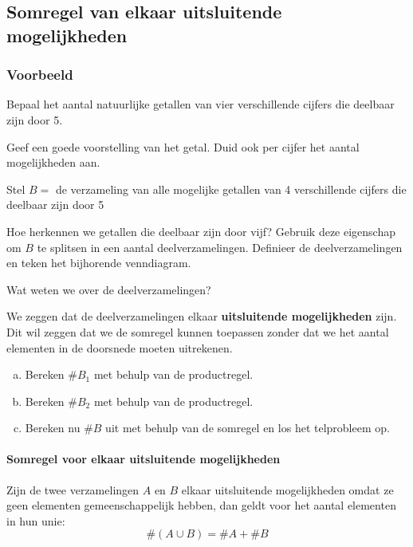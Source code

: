 \documentclass[12pt,twoside]{article}
\begin{document}
\begin{theorie}

\subsection{Somregel van elkaar uitsluitende mogelijkheden}

\subsubsection*{Voorbeeld}

Bepaal het aantal natuurlijke getallen van vier verschillende cijfers die deelbaar zijn door 5.

Geef een goede voorstelling van het getal. Duid ook per cijfer het aantal mogelijkheden aan.

Stel $B=$ de verzameling van alle mogelijke getallen van 4 verschillende cijfers die deelbaar zijn door 5

Hoe herkennen we getallen die deelbaar zijn door vijf? Gebruik deze eigenschap om $B$ te splitsen in een aantal deelverzamelingen. Definieer de deelverzamelingen en teken het bijhorende venndiagram.
\vspace*{4cm}

Wat weten we over de deelverzamelingen?

We zeggen dat de deelverzamelingen elkaar {\bf uitsluitende mogelijkheden} zijn. Dit wil zeggen dat we de somregel kunnen toepassen zonder dat we het aantal elementen in de doorsnede moeten uitrekenen.

\begin{enumerate}[(a)]
  \item Bereken $\#B_1$ met behulp van de productregel.
  \item Bereken $\#B_2$ met behulp van de productregel.
  \item Bereken nu $\#B$ uit met behulp van de somregel en los het telprobleem op.
\end{enumerate}

\paragraph*{Somregel voor elkaar uitsluitende mogelijkheden}
\begin{mdframed}
Zijn de twee verzamelingen $A$ en $B$ elkaar uitsluitende mogelijkheden omdat ze geen elementen gemeenschappelijk hebben, dan geldt voor het aantal elementen in hun unie:
$$\#(A\cup B) = \#A + \#B$$
\end{mdframed}

\end{theorie}
\end{document}
